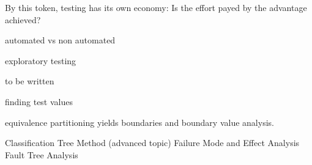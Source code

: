 \documentclass[\docroot/main]{subfiles}
\begin{document}
By this token, testing has its own economy: Is the effort payed by the
advantage achieved?


automated vs non automated

exploratory testing 

to be written

finding test values


equivalence partitioning yields boundaries and boundary value
analysis.


Classification Tree Method (advanced topic)
Failure Mode and Effect Analysis
Fault Tree Analysis
\end{document}

